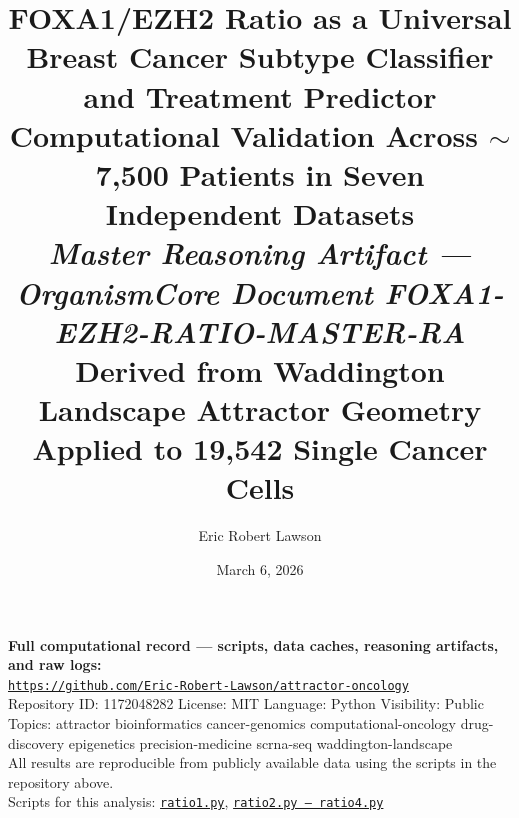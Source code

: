 \documentclass[12pt, a4paper]{article}
\title{
    \vspace{-1em}
    \textbf{FOXA1/EZH2 Ratio as a Universal Breast Cancer
    Subtype Classifier and Treatment Predictor}\\[0.6em]
    \large Computational Validation Across $\sim$7,500
    Patients in Seven Independent Datasets\\[0.4em]
    \normalsize \textit{Master Reasoning Artifact ---
    OrganismCore Document FOXA1-EZH2-RATIO-MASTER-RA}\\[0.4em]
    \small Derived from Waddington Landscape Attractor
    Geometry Applied to 19,542 Single Cancer Cells
}
\author[1]{Eric Robert Lawson}
\affil[1]{
    OrganismCore\\
    \href{mailto:OrganismCore@proton.me}
         {OrganismCore@proton.me}\\
    ORCID:
    \href{https://orcid.org/0009-0002-0414-6544}
         {0009-0002-0414-6544}
}
\date{March 6, 2026}
\begin{document}

\maketitle
\thispagestyle{fancy}

\begin{center}
\colorbox{repobox}{
\begin{minipage}{0.88\textwidth}
\vspace{0.5em}
\centering
\textbf{Full computational record --- scripts, data caches,
reasoning artifacts, and raw logs:}\\[0.4em]
\href{https://github.com/Eric-Robert-Lawson/attractor-oncology}
{\texttt{https://github.com/Eric-Robert-Lawson/attractor-oncology}}
\\[0.3em]
\small
Repository ID: 1172048282 \textbar{}
License: MIT \textbar{}
Language: Python \textbar{}
Visibility: Public\\[0.2em]
Topics: attractor \textperiodcentered{}
        bioinformatics \textperiodcentered{}
        cancer-genomics \textperiodcentered{}
        computational-oncology \textperiodcentered{}
        drug-discovery \textperiodcentered{}
        epigenetics \textperiodcentered{}
        precision-medicine \textperiodcentered{}
        scrna-seq \textperiodcentered{}
        waddington-landscape\\[0.3em]
All results are reproducible from publicly available data
using the scripts in the repository above.\\
Scripts for this analysis:
\href{https://github.com/Eric-Robert-Lawson/attractor-oncology/blob/main/Cancer_Research/BRCA/DEEP_DIVE/MAJOR_FINDINGS/FOXA1_EZH2_RATIO/ratio1.py}{\texttt{ratio1.py}},
\href{https://github.com/Eric-Robert-Lawson/attractor-oncology/blob/main/Cancer_Research/BRCA/DEEP_DIVE/MAJOR_FINDINGS/FOXA1_EZH2_RATIO/ratio4.py}{\texttt{ratio2.py -- ratio4.py}}
\vspace{0.5em}
\end{minipage}
}
\end{center}

\vspace{0.8em}
\end{document}
